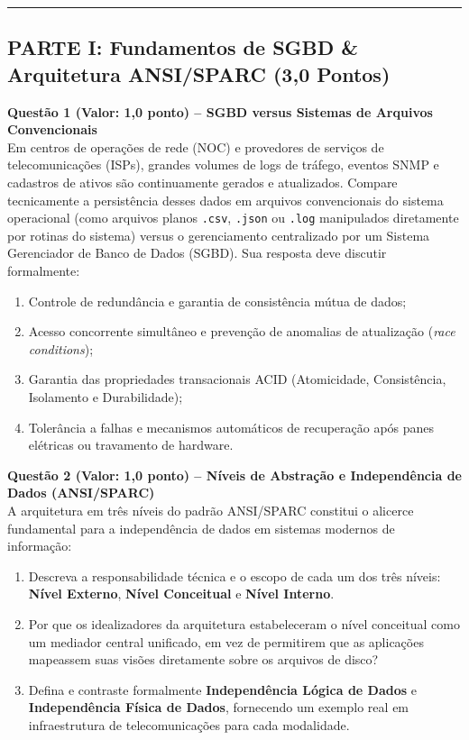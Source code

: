 \documentclass[11pt,a4paper]{article}
\begin{document}
\vspace{0.3cm}
\hrule
\vspace{0.4cm}

\subsection*{PARTE I: Fundamentos de SGBD \& Arquitetura ANSI/SPARC (3,0 Pontos)}

\noindent\textbf{Questão 1 (Valor: 1,0 ponto) -- SGBD versus Sistemas de Arquivos Convencionais}\\[0.1cm]
Em centros de operações de rede (NOC) e provedores de serviços de telecomunicações (ISPs), grandes volumes de logs de tráfego, eventos SNMP e cadastros de ativos são continuamente gerados e atualizados. Compare tecnicamente a persistência desses dados em arquivos convencionais do sistema operacional (como arquivos planos \texttt{.csv}, \texttt{.json} ou \texttt{.log} manipulados diretamente por rotinas do sistema) versus o gerenciamento centralizado por um Sistema Gerenciador de Banco de Dados (SGBD). Sua resposta deve discutir formalmente:
\begin{enumerate}[label=\alph*),itemsep=1pt]
  \item Controle de redundância e garantia de consistência mútua de dados;
  \item Acesso concorrente simultâneo e prevenção de anomalias de atualização (\textit{race conditions});
  \item Garantia das propriedades transacionais ACID (Atomicidade, Consistência, Isolamento e Durabilidade);
  \item Tolerância a falhas e mecanismos automáticos de recuperação após panes elétricas ou travamento de hardware.
\end{enumerate}

\vspace{0.3cm}
\noindent\textbf{Questão 2 (Valor: 1,0 ponto) -- Níveis de Abstração e Independência de Dados (ANSI/SPARC)}\\[0.1cm]
A arquitetura em três níveis do padrão ANSI/SPARC constitui o alicerce fundamental para a independência de dados em sistemas modernos de informação:
\begin{enumerate}[label=\alph*),itemsep=1pt]
  \item Descreva a responsabilidade técnica e o escopo de cada um dos três níveis: \textbf{Nível Externo}, \textbf{Nível Conceitual} e \textbf{Nível Interno}.
  \item Por que os idealizadores da arquitetura estabeleceram o nível conceitual como um mediador central unificado, em vez de permitirem que as aplicações mapeassem suas visões diretamente sobre os arquivos de disco?
  \item Defina e contraste formalmente \textbf{Independência Lógica de Dados} e \textbf{Independência Física de Dados}, fornecendo um exemplo real em infraestrutura de telecomunicações para cada modalidade.
\end{enumerate}
\end{document}
